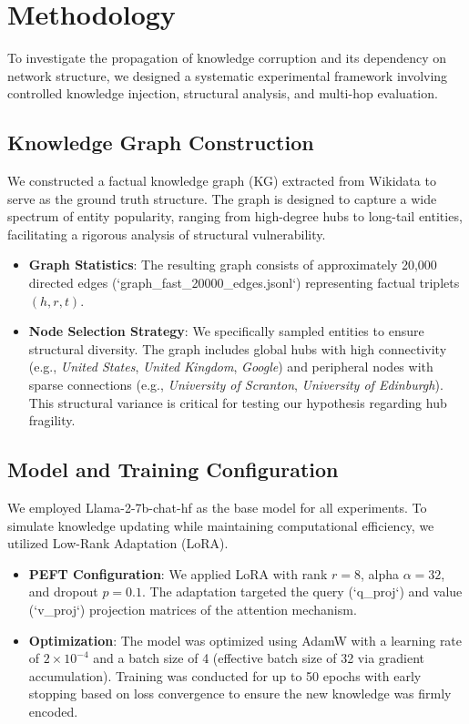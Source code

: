 \section{Methodology}
\label{sec:method}

To investigate the propagation of knowledge corruption and its dependency on network structure, we designed a systematic experimental framework involving controlled knowledge injection, structural analysis, and multi-hop evaluation.

\subsection{Knowledge Graph Construction}
We constructed a factual knowledge graph (KG) extracted from Wikidata to serve as the ground truth structure. The graph is designed to capture a wide spectrum of entity popularity, ranging from high-degree hubs to long-tail entities, facilitating a rigorous analysis of structural vulnerability.

\begin{itemize}
    \item \textbf{Graph Statistics}: The resulting graph consists of approximately 20,000 directed edges (`graph\_fast\_20000\_edges.jsonl`) representing factual triplets $(h, r, t)$.
    \item \textbf{Node Selection Strategy}: We specifically sampled entities to ensure structural diversity. The graph includes global hubs with high connectivity (e.g., \textit{United States}, \textit{United Kingdom}, \textit{Google}) and peripheral nodes with sparse connections (e.g., \textit{University of Scranton}, \textit{University of Edinburgh}). This structural variance is critical for testing our hypothesis regarding hub fragility.
\end{itemize}

\subsection{Model and Training Configuration}
We employed Llama-2-7b-chat-hf as the base model for all experiments. To simulate knowledge updating while maintaining computational efficiency, we utilized Low-Rank Adaptation (LoRA).

\begin{itemize}
    \item \textbf{PEFT Configuration}: We applied LoRA with rank $r=8$, alpha $\alpha=32$, and dropout $p=0.1$. The adaptation targeted the query (`q\_proj`) and value (`v\_proj`) projection matrices of the attention mechanism.
    \item \textbf{Optimization}: The model was optimized using AdamW with a learning rate of $2 \times 10^{-4}$ and a batch size of 4 (effective batch size of 32 via gradient accumulation). Training was conducted for up to 50 epochs with early stopping based on loss convergence to ensure the new knowledge was firmly encoded.
\end{itemize}

